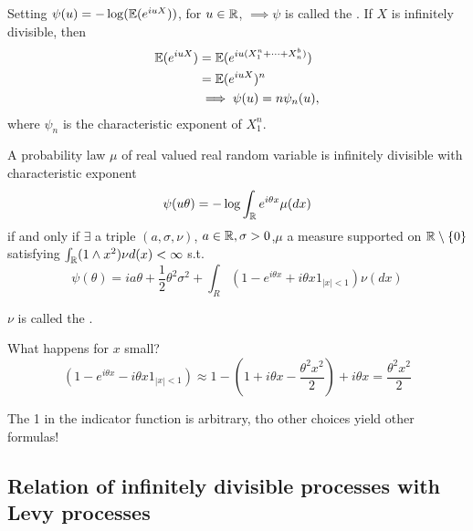 \begin{remark}
    Setting $\psi(u)=-\log(\mathbb{E}(e^{iuX}))$, for $u\in \mathbb{R}$, $\implies \psi$ is called the .
    If $X$ is infinitely divisible, then 
    \begin{align*}
        \mathbb{E}(e^{iuX})&=\mathbb{E}(e^{iu(X_1^n+\dots+X_n^b)})\\
        &=\mathbb{E}(e^{iuX})^n \\
        &\implies \psi(u)=n\psi_n(u),
    \end{align*} 
    where $\psi_n$ is the characteristic exponent of $X_1^n$.
\end{remark}

\begin{theorem}\label{thm:4.2}
    A probability law $\mu$ of real valued real random variable is infinitely divisible with
    characteristic exponent
    \[\psi(u\theta)=-\log\int_{\mathbb{R}} e^{i\theta x}\mu(dx)\]
    if and only if $\exists$ a triple $(a,\sigma,\nu)$, $a\in\mathbb{R},\sigma>0$,$\mu$ a measure supported on 
    $\mathbb{R}\setminus\{0\}$ satisfying $\int_{\mathbb{R}} (1\land x^2)\nu d(x)<\infty$ s.t.
    \[\psi(\theta)=ia\theta+\frac{1}{2}\theta^2\sigma^2+\int_R(1-e^{i\theta x}+i\theta x 1_{|x|< 1})\nu(dx)\] 
\end{theorem}

\begin{aremark}
    $\nu$ is called the .
\end{aremark}

\begin{aremark}
    What happens for $x$ small? 
    \[(1-e^{i\theta x}-i\theta x 1_{|x|< 1})\approx 1- (1+i\theta x-\frac{\theta^2 x^2}{2})+i\theta x=\frac{\theta^2 x^2}{2}\]
\end{aremark}

\begin{aremark}
    The 1 in the indicator function is arbitrary, tho other choices yield other formulas!
\end{aremark}

\subsection{Relation of infinitely divisible processes with Levy processes}

